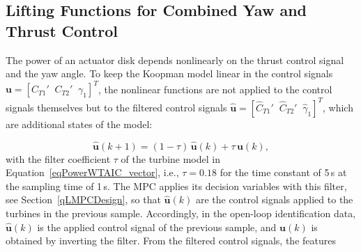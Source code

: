 %
\subsection{Lifting Functions for Combined Yaw and Thrust Control}\label{sec:lifting functions for Combined Yaw and Thrust Control}
The power of an actuator disk depends nonlinearly on the thrust control signal and the yaw angle. To keep the Koopman model linear in the control signals $\bm{u} = [C_{T1}' \;\; C_{T2}' \;\; \gamma_1]^T$, the nonlinear functions are not applied to the control signals themselves but to the filtered control signals $\hat{\bm{u}} = [\hat{C}_{T1}' \;\; \hat{C}_{T2}' \;\; \hat{\gamma}_1]^T$, which are additional states of the model:

\begin{equation} \label{eq:FiltInputs}
    \hat{\bm{u}}(k+1) = (1-\tau)\,\hat{\bm{u}}(k) + \tau\,\bm{u}(k),
\end{equation}
with the filter coefficient $\tau$ of the turbine model in Equation~\eqref{eqPowerWTAIC_vector}, i.e., $\tau = 0.18$ for the time constant of 5\,s at the sampling time of 1\,s. The MPC applies its decision variables with this filter, see Section~\ref{qLMPCDesign}, so that $\hat{\bm{u}}(k)$ are the control signals applied to the turbines in the previous sample. Accordingly, in the open-loop identification data, $\hat{\bm{u}}(k)$ is the applied control signal of the previous sample, and $\bm{u}(k)$ is obtained by inverting the filter. From the filtered control signals, the features

